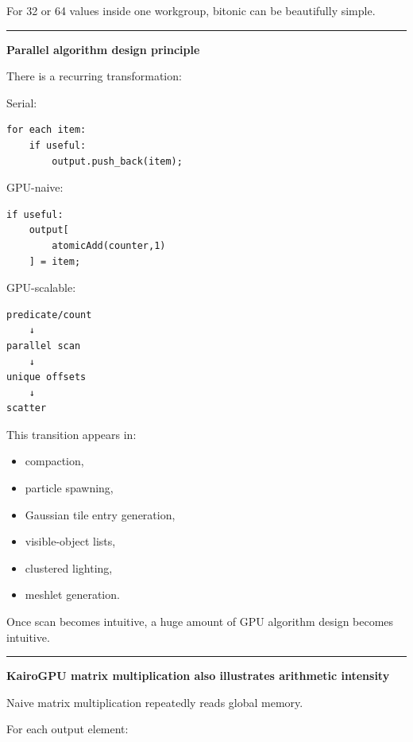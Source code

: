 For 32 or 64 values inside one workgroup, bitonic can be beautifully simple.

\begin{center}\rule{0.5\linewidth}{0.5pt}\end{center}

\textbf{Parallel algorithm design principle}

There is a recurring transformation:

Serial:

\protect{}\label{x1rcxl}%
\begin{verbatim}
for each item:
    if useful:
        output.push_back(item);
\end{verbatim}

GPU-naive:

\protect{}\label{di1gjk}%
\begin{verbatim}
if useful:
    output[
        atomicAdd(counter,1)
    ] = item;
\end{verbatim}

GPU-scalable:

\protect{}\label{0aznm5}%
\begin{verbatim}
predicate/count
    ↓
parallel scan
    ↓
unique offsets
    ↓
scatter
\end{verbatim}

This transition appears in:

\begin{itemize}
\tightlist
\item
  compaction,
\item
  particle spawning,
\item
  Gaussian tile entry generation,
\item
  visible-object lists,
\item
  clustered lighting,
\item
  meshlet generation.
\end{itemize}

Once scan becomes intuitive, a huge amount of GPU algorithm design becomes intuitive.

\begin{center}\rule{0.5\linewidth}{0.5pt}\end{center}

\textbf{KairoGPU matrix multiplication also illustrates arithmetic intensity}

Naive matrix multiplication repeatedly reads global memory.

For each output element:

